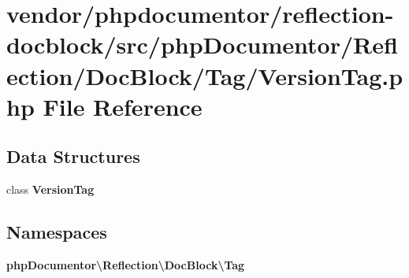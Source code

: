 \section{vendor/phpdocumentor/reflection-\/docblock/src/php\+Documentor/\+Reflection/\+Doc\+Block/\+Tag/\+Version\+Tag.php File Reference}
\label{_version_tag_8php}
\subsection*{Data Structures}
\begin{DoxyCompactItemize}
\item 
class {\bf Version\+Tag}
\end{DoxyCompactItemize}
\subsection*{Namespaces}
\begin{DoxyCompactItemize}
\item 
 {\bf php\+Documentor\textbackslash{}\+Reflection\textbackslash{}\+Doc\+Block\textbackslash{}\+Tag}
\end{DoxyCompactItemize}
